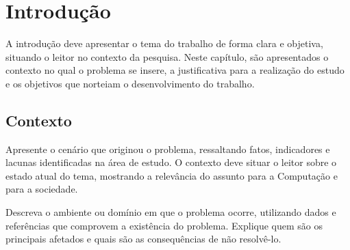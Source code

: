 \documentclass[
    12pt,                %
    openright,           %
    oneside,             %
    a4paper,             %
    english,             %
    brazil               %
]{abntex2}
\begin{document}

\tableofcontents*
\cleardoublepage

\textual

\chapter{Introdução}
\label{cap:introducao}

A introdução deve apresentar o tema do trabalho de forma clara e objetiva, 
situando o leitor no contexto da pesquisa. Neste capítulo, 
são apresentados o contexto no qual o problema se insere, 
a justificativa para a realização do estudo e os objetivos que norteiam o desenvolvimento do trabalho.

\section{Contexto}
\label{sec:contexto}

Apresente o cenário que originou o problema, ressaltando fatos, indicadores e lacunas identificadas na área de estudo. O contexto deve situar o leitor sobre o estado atual do tema, mostrando a relevância do assunto para a Computação e para a sociedade.

Descreva o ambiente ou domínio em que o problema ocorre, utilizando dados e referências que comprovem a existência do problema. Explique quem são os principais afetados e quais são as consequências de não resolvê-lo.
\end{document}
